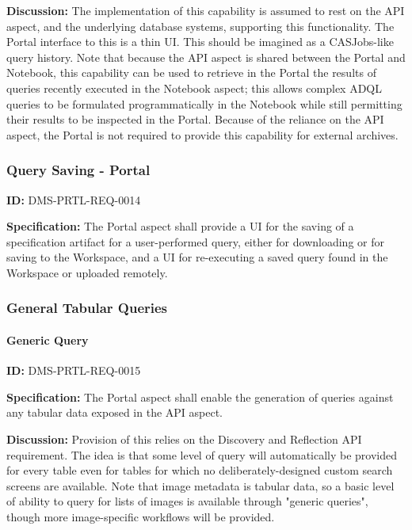 \documentclass[SE,toc]{lsstdoc}
\begin{document}
\textbf{Discussion:}
The implementation of this capability is assumed to rest on the API aspect, and the underlying database systems, supporting this functionality. The Portal interface to this is a thin UI.  This should be imagined as a CASJobs-like query history.
Note that because the API aspect is shared between the Portal and Notebook, this capability can be used to retrieve in the Portal the results of queries recently executed in the Notebook aspect; this allows complex ADQL queries to be formulated programmatically in the Notebook while still permitting their results to be inspected in the Portal.
Because of the reliance on the API aspect, the Portal is not required to provide this capability for external archives.

\subsubsection{Query Saving - Portal}

\label{DMS-PRTL-REQ-0014}
\textbf{ID:} DMS-PRTL-REQ-0014

\textbf{Specification:}
The Portal aspect shall provide a UI for the saving of a specification artifact for a user-performed query, either for downloading or for saving to the Workspace, and a UI for re-executing a saved query found in the Workspace or uploaded remotely.

\subsubsection{General Tabular Queries}

\paragraph{Generic Query}\hfill  %

\label{DMS-PRTL-REQ-0015}
\textbf{ID:} DMS-PRTL-REQ-0015

\textbf{Specification:}
The Portal aspect shall enable the generation of queries against any tabular data exposed in the API aspect.

\textbf{Discussion:}
Provision of this relies on the Discovery and Reflection API requirement.  The idea is that some level of query will automatically be provided for every table even for tables for which no deliberately-designed custom search screens are available.
Note that image metadata is tabular data, so a basic level of ability to query for lists of images is available through "generic queries", though more image-specific workflows will be provided.
\end{document}

